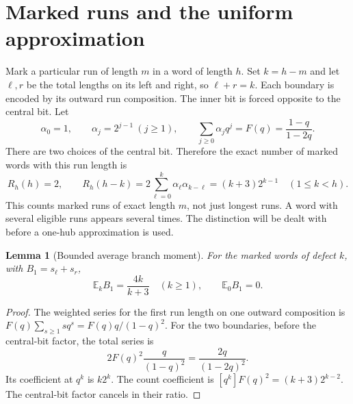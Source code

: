 \documentclass[11pt,letterpaper]{article}
\numberwithin{equation}{section}
\newtheorem{lemma}[theorem]{Lemma}
\theoremstyle{remark}\newtheorem{remark}[theorem]{Remark}
\begin{document}
\section{Marked runs and the uniform approximation}\label{mdk:asp:sec:uniform}
Mark a particular run of length $m$ in a word of length $h$. Set $k=h-m$ and let $\ell,r$ be the total lengths on its left and right, so $\ell+r=k$. Each boundary is encoded by its outward run composition. The inner bit is forced opposite to the central bit. Let
\[
\alpha_0=1,\qquad \alpha_j=2^{j-1}\ (j\ge1),\qquad
\sum_{j\ge0}\alpha_jq^j=F(q)=\frac{1-q}{1-2q}.
\]
There are two choices of the central bit. Therefore the exact number of marked words with this run length is
\begin{equation}\label{mdk:asp:eq:marked}
R_h(h)=2,\qquad R_h(h-k)=2\sum_{\ell=0}^k\alpha_\ell\alpha_{k-\ell}
=(k+3)2^{k-1}\quad(1\le k<h).
\end{equation}
This counts marked runs of exact length $m$, not just longest runs. A word with several eligible runs appears several times. The distinction will be dealt with before a one-hub approximation is used.

\begin{lemma}[Bounded average branch moment]\label{mdk:asp:lem:mean}
For the marked words of defect $k$, with $B_1=s_\ell+s_r$,
\begin{equation}\label{mdk:asp:eq:mean}
\mathbb E_k B_1=\frac{4k}{k+3}\quad(k\ge1),\qquad \mathbb E_0B_1=0.
\end{equation}
\end{lemma}
\begin{proof}
The weighted series for the first run length on one outward composition is
$F(q)\sum_{s\ge1}s q^s=F(q)q/(1-q)^2$.
For the two boundaries, before the central-bit factor, the total series is
\[
2F(q)^2\frac q{(1-q)^2}=\frac{2q}{(1-2q)^2}.
\]
Its coefficient at $q^k$ is $k2^k$. The count coefficient is
$[q^k]F(q)^2=(k+3)2^{k-2}$. The central-bit factor cancels in their ratio.
\end{proof}
\end{document}
